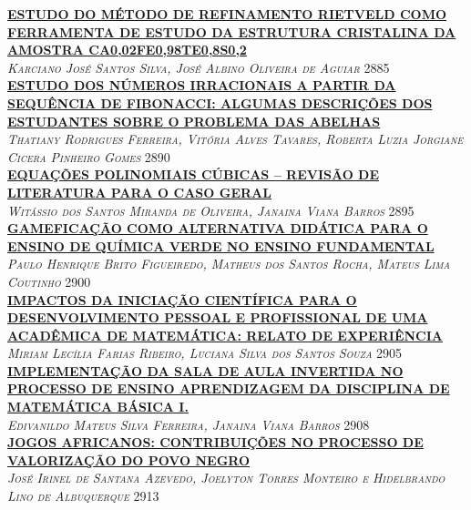\noindent \textsc{\hyperlink{trabalhos/249293.pdf.1}{\textbf{ESTUDO DO MÉTODO DE REFINAMENTO RIETVELD COMO  FERRAMENTA DE ESTUDO DA ESTRUTURA CRISTALINA DA AMOSTRA CA0,02FE0,98TE0,8S0,2}}}\\ 
\noindent \textsc{\textit{Karciano José Santos Silva, José Albino Oliveira de Aguiar}} \hfill 2885\\ 

\noindent \textsc{\hyperlink{trabalhos/250242.pdf.1}{\textbf{ESTUDO DOS NÚMEROS IRRACIONAIS A PARTIR DA SEQUÊNCIA DE FIBONACCI: ALGUMAS DESCRIÇÕES DOS ESTUDANTES SOBRE O PROBLEMA DAS ABELHAS}}}\\ 
\noindent \textsc{\textit{Thatiany Rodrigues Ferreira, Vitória Alves Tavares, Roberta Luzia Jorgiane Cicera Pinheiro Gomes}} \hfill 2890\\ 

\noindent \textsc{\hyperlink{trabalhos/250222.pdf.1}{\textbf{EQUAÇÕES POLINOMIAIS CÚBICAS – REVISÃO DE LITERATURA PARA O CASO GERAL}}}\\ 
\noindent \textsc{\textit{Witássio dos Santos Miranda de Oliveira, Janaina Viana Barros}} \hfill 2895\\ 

\noindent \textsc{\hyperlink{trabalhos/249295.pdf.1}{\textbf{GAMEFICAÇÃO COMO ALTERNATIVA DIDÁTICA PARA O ENSINO DE QUÍMICA VERDE NO ENSINO FUNDAMENTAL }}}\\ 
\noindent \textsc{\textit{Paulo Henrique Brito Figueiredo, Matheus dos Santos Rocha, Mateus Lima Coutinho}} \hfill 2900\\ 

\noindent \textsc{\hyperlink{trabalhos/251775.pdf.1}{\textbf{IMPACTOS DA INICIAÇÃO CIENTÍFICA PARA O DESENVOLVIMENTO PESSOAL E PROFISSIONAL DE UMA ACADÊMICA DE MATEMÁTICA: RELATO DE EXPERIÊNCIA}}}\\ 
\noindent \textsc{\textit{Miriam Lecília Farias Ribeiro, Luciana Silva dos Santos Souza}} \hfill 2905\\ 

\noindent \textsc{\hyperlink{trabalhos/250044.pdf.1}{\textbf{IMPLEMENTAÇÃO DA SALA DE AULA INVERTIDA NO PROCESSO DE ENSINO APRENDIZAGEM DA DISCIPLINA DE MATEMÁTICA BÁSICA I.}}}\\ 
\noindent \textsc{\textit{Edivanildo Mateus Silva Ferreira, Janaina Viana Barros}} \hfill 2908\\ 

\noindent \textsc{\hyperlink{trabalhos/248394.pdf.1}{\textbf{JOGOS AFRICANOS: CONTRIBUIÇÕES NO PROCESSO DE VALORIZAÇÃO DO POVO NEGRO}}}\\ 
\noindent \textsc{\textit{José Irinel de Santana Azevedo, Joelyton Torres Monteiro e Hidelbrando Lino de Albuquerque}} \hfill 2913\\ 

